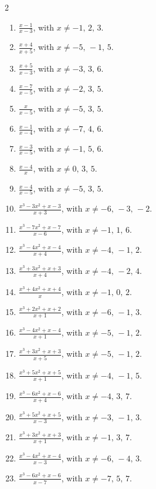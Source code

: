 \documentclass[11pt,oneside]{book}
\begin{document}
\begin{multicols}{2}
\begin{enumerate}[leftmargin=*,label=\textbf{J\arabic*.},itemsep=0.45\baselineskip]
\item $\displaystyle \frac{x - 1}{x - 3}$, with $x\ne -1,\,2,\,3$.
\item $\displaystyle \frac{x + 4}{x + 5}$, with $x\ne -5,\,-1,\,5$.
\item $\displaystyle \frac{x + 5}{x - 3}$, with $x\ne -3,\,3,\,6$.
\item $\displaystyle \frac{x - 7}{x - 5}$, with $x\ne -2,\,3,\,5$.
\item $\displaystyle \frac{x}{x - 5}$, with $x\ne -5,\,3,\,5$.
\item $\displaystyle \frac{x - 1}{x - 4}$, with $x\ne -7,\,4,\,6$.
\item $\displaystyle \frac{x - 3}{x - 5}$, with $x\ne -1,\,5,\,6$.
\item $\displaystyle \frac{x - 4}{x}$, with $x\ne 0,\,3,\,5$.
\item $\displaystyle \frac{x - 4}{x - 5}$, with $x\ne -5,\,3,\,5$.
\item $\displaystyle \frac{x^{3} - 3 x^{2} + x - 3}{x + 3}$, with $x\ne -6,\,-3,\,-2$.
\item $\displaystyle \frac{x^{3} - 7 x^{2} + x - 7}{x - 6}$, with $x\ne -1,\,1,\,6$.
\item $\displaystyle \frac{x^{3} - 4 x^{2} + x - 4}{x + 4}$, with $x\ne -4,\,-1,\,2$.
\item $\displaystyle \frac{x^{3} + 3 x^{2} + x + 3}{x + 4}$, with $x\ne -4,\,-2,\,4$.
\item $\displaystyle \frac{x^{3} + 4 x^{2} + x + 4}{x}$, with $x\ne -1,\,0,\,2$.
\item $\displaystyle \frac{x^{3} + 2 x^{2} + x + 2}{x + 1}$, with $x\ne -6,\,-1,\,3$.
\item $\displaystyle \frac{x^{3} - 4 x^{2} + x - 4}{x + 1}$, with $x\ne -5,\,-1,\,2$.
\item $\displaystyle \frac{x^{3} + 3 x^{2} + x + 3}{x + 5}$, with $x\ne -5,\,-1,\,2$.
\item $\displaystyle \frac{x^{3} + 5 x^{2} + x + 5}{x + 1}$, with $x\ne -4,\,-1,\,5$.
\item $\displaystyle \frac{x^{3} - 6 x^{2} + x - 6}{x + 4}$, with $x\ne -4,\,3,\,7$.
\item $\displaystyle \frac{x^{3} + 5 x^{2} + x + 5}{x - 3}$, with $x\ne -3,\,-1,\,3$.
\item $\displaystyle \frac{x^{3} + 3 x^{2} + x + 3}{x + 1}$, with $x\ne -1,\,3,\,7$.
\item $\displaystyle \frac{x^{3} - 4 x^{2} + x - 4}{x - 3}$, with $x\ne -6,\,-4,\,3$.
\item $\displaystyle \frac{x^{3} - 6 x^{2} + x - 6}{x - 7}$, with $x\ne -7,\,5,\,7$.

\end{enumerate}
\end{multicols}
\end{document}
